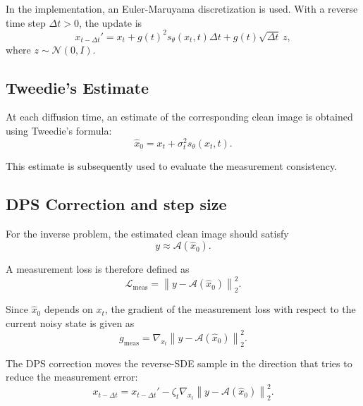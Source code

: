\documentclass[12pt,a4paper]{report}
\begin{document}
\noindent
In the implementation, an Euler-Maruyama discretization is used. With a reverse time step $\Delta t>0$, the update is
\begin{equation}
    x_{t-\Delta t}'
    =
    x_t
    +
    g(t)^2s_\theta(x_t,t)\Delta t
    +
    g(t)\sqrt{\Delta t}\,z,
\end{equation}
where $z\sim\mathcal{N}(0,I).$

\subsection{Tweedie's Estimate}
At each diffusion time, an estimate of the corresponding clean image is obtained using Tweedie's formula:
\begin{equation}
    \hat{x}_0
    =
    x_t+\sigma_t^2s_\theta(x_t,t).
\end{equation}

\noindent
This estimate is subsequently used to evaluate the measurement consistency.

\subsection{DPS Correction and step size}
For the inverse problem, the estimated clean image should satisfy
\begin{equation}
    y\approx\mathcal{A}(\hat{x}_0).
\end{equation}

\noindent
A measurement loss is therefore defined as
\begin{equation}
    \mathcal{L}_{\mathrm{meas}}
    =
    \left\|
    y-\mathcal{A}(\hat{x}_0)
    \right\|_2^2.
\end{equation}

\noindent
Since $\hat{x}_0$ depends on $x_t$, the gradient of the measurement loss with respect to the current noisy state is given as
\begin{equation}
    g_{\mathrm{meas}}
    =
    \nabla_{x_t}
    \left\|
    y-\mathcal{A}(\hat{x}_0)
    \right\|_2^2.
\end{equation}

\noindent
The DPS correction moves the reverse-SDE sample in the direction that tries to reduce the measurement error:
\begin{equation}
    x_{t-\Delta t}
    =
    x_{t-\Delta t}'
    -
    \zeta_t
    \nabla_{x_t}
    \left\|
    y-\mathcal{A}(\hat{x}_0)
    \right\|_2^2.
\end{equation}
\end{document}
